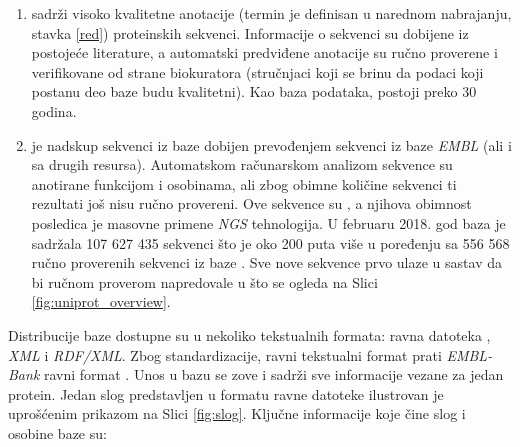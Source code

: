 \begin{enumerate}
  \item \keyword{\swissprot}  sadrži visoko kvalitetne anotacije
     (termin je definisan u narednom nabrajanju,
    stavka \ref{red}) proteinskih sekvenci.  Informacije o sekvenci su dobijene
    iz postojeće literature, a automatski predviđene anotacije su ručno
    proverene i verifikovane od strane biokuratora (stručnjaci koji se brinu da
    podaci koji postanu deo baze \swissprot budu kvalitetni).  Kao baza
    podataka, \swissprot postoji preko 30 godina.

  \item \trembl {} je nadskup sekvenci iz baze \swissprot
    dobijen prevođenjem sekvenci iz baze \textit{EMBL} (ali i sa drugih
    resursa). Automatskom računarskom analizom sekvence su anotirane funkcijom
    i osobinama, ali zbog obimne količine sekvenci ti rezultati još nisu ručno
    provereni.  Ove sekvence su , a njihova obimnost posledica je
    masovne primene \textit{NGS} tehnologija. U februaru 2018. god baza \trembl je sadržala
    107 627 435 sekvenci što je oko 200 puta više u poređenju sa 556 568 ručno
    proverenih sekvenci iz baze \swissprot. Sve nove sekvence prvo ulaze u sastav
    \trembl da bi ručnom proverom napredovale u \swissprot što se ogleda na
    Slici \ref{fig:uniprot_overview}.
\end{enumerate}





Distribucije baze \swissprot dostupne su u nekoliko tekstualnih formata: ravna
datoteka , \textit{XML} i \textit{RDF/XML}.  Zbog
standardizacije, ravni tekstualni format prati \textit{EMBL-Bank} ravni format
\parencite{svisprot2003}.  Unos u bazu se zove   i
sadrži sve informacije vezane za jedan protein.  Jedan slog predstavljen u
formatu ravne datoteke ilustrovan je uprošćenim prikazom  na Slici
\ref{fig:slog}.  Ključne informacije koje čine slog i osobine baze \swissprot su:


